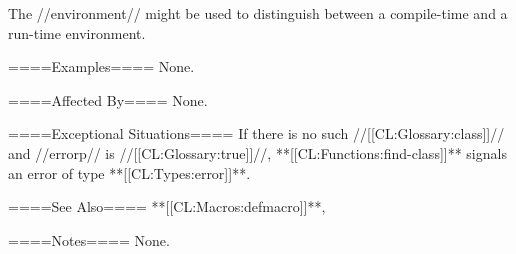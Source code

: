 The //environment// might be used to distinguish between a compile-time and a run-time environment.

====Examples====
None.

====Affected By====
None.

====Exceptional Situations====
If there is no such //[[CL:Glossary:class]]// and //errorp// is //[[CL:Glossary:true]]//, **[[CL:Functions:find-class]]** signals an error of type **[[CL:Types:error]]**.

====See Also====
**[[CL:Macros:defmacro]]**, {\secref\IntegratingTypesAndClasses}

====Notes====
None.

  
